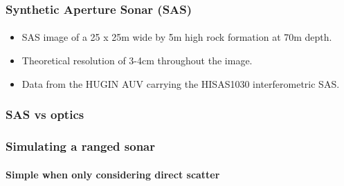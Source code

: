 \documentclass[
    beamer                                       %
  ,table,dvipsnames,svgnames
]{common/mytemplate}
\begin{document}
{
%
\begin{frame}
\frametitle{\hspace{-.5cm}Synthetic Aperture Sonar (SAS)}
\framesubtitle{}
\vspace{-10pt}
\begin{figure}[H]
\begin{narrow}{.1cm}{-0.6cm}
\flushright\hspace{-10pt}
\end{narrow}
\end{figure}
\vspace{-10pt}
\begin{narrow}{-0.5cm}{-0.5cm}
\begin{itemize}\small
\item SAS image of a 25 x 25m wide by 5m high rock formation at 70m depth.
\item Theoretical resolution of 3-4cm throughout the image.
\item Data from the HUGIN AUV carrying the HISAS1030 interferometric SAS.
\end{itemize}
\end{narrow}
\end{frame}
}

{
%
\begin{frame}
\frametitle{SAS vs optics}
\framesubtitle{}
\vspace{8cm}
\end{frame}
}

{
%
\begin{frame}
\frametitle{Simulating a ranged sonar}
\framesubtitle{Simple when only considering direct scatter}
\vspace{8cm}
\end{frame}
}
\end{document}
